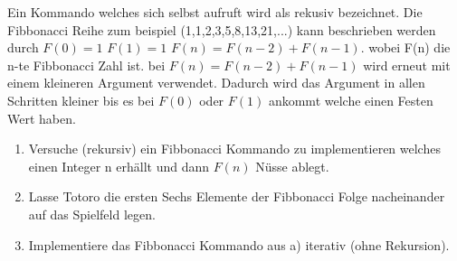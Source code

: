\begin{Infobox}[Rekursion]
Ein Kommando welches sich selbst aufruft wird als rekusiv bezeichnet. Die Fibbonacci Reihe zum beispiel (1,1,2,3,5,8,13,21,...) kann beschrieben werden durch $F(0)=1$ $F(1)=1$ $F(n)=F(n-2)+F(n-1)$. wobei F(n) die n-te Fibbonacci Zahl ist. bei $F(n)=F(n-2)+F(n-1)$ wird erneut mit einem kleineren Argument verwendet. Dadurch wird das Argument in allen Schritten kleiner bis es bei $F(0)$ oder $F(1)$ ankommt welche einen Festen Wert haben.
\end{Infobox}
\begin{enumerate}
\item Versuche (rekursiv) ein Fibbonacci Kommando zu implementieren welches einen Integer n erhällt und dann $F(n)$ Nüsse ablegt.
\item Lasse Totoro die ersten Sechs Elemente der Fibbonacci Folge nacheinander auf das Spielfeld legen.
\item \optional Implementiere das Fibbonacci Kommando aus a) iterativ (ohne Rekursion).  
\end{enumerate}
